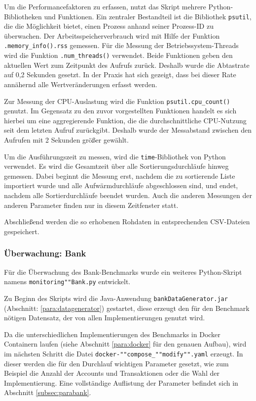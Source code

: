 \documentclass[fontsize=12pt,paper=a4,twoside=semi,parskip=half-,headsepline,headinclude]{scrreprt}
\begin{document}
Um die Performancefaktoren zu erfassen, nutzt das Skript mehrere Python-Bibliotheken und Funktionen. Ein zentraler Bestandteil ist die Bibliothek \texttt{psutil}, die die Möglichkeit bietet, einen Prozess anhand seiner Prozess-ID zu überwachen. Der Arbeitsspeicherverbrauch wird mit Hilfe der Funktion \texttt{.memory\_info().rss} gemessen. Für die Messung der Betriebssystem-Threads wird die Funktion \texttt{.num\_threads()} verwendet. Beide Funktionen geben den aktuellen Wert zum Zeitpunkt des Aufrufs zurück. Deshalb wurde die Abtastrate auf 0,2 Sekunden gesetzt. In der Praxis hat sich gezeigt, dass bei dieser Rate annähernd alle Wertveränderungen erfasst werden.

Zur Messung der CPU-Auslastung wird die Funktion \texttt{psutil.cpu\_count()} genutzt. Im Gegensatz zu den zuvor vorgestellten Funktionen handelt es sich hierbei um eine aggregierende Funktion, die die durchschnittliche CPU-Nutzung seit dem letzten Aufruf zurückgibt. Deshalb wurde der Messabstand zwischen den Aufrufen mit 2 Sekunden größer gewählt.

Um die Ausführungszeit zu messen, wird die \texttt{time}-Bibliothek von Python verwendet. Es wird die Gesamtzeit über alle Sortierungsdurchläufe hinweg gemessen. Dabei beginnt die Messung erst, nachdem die zu sortierende Liste importiert wurde und alle Aufwärmdurchläufe abgeschlossen sind, und endet, nachdem alle Sortierdurchläufe beendet wurden. Auch die anderen Messungen der anderen Parameter finden nur in diesem Zeitfenster statt. 

Abschließend werden die so erhobenen Rohdaten in entsprechenden CSV-Dateien gespeichert.

\subsubsection{Überwachung: Bank}
\label{subsubsec:monibank}

Für die Überwachung des Bank-Benchmarks wurde ein weiteres Python-Skript namens \texttt{monitoring""Bank.py} entwickelt.

Zu Beginn des Skripts wird die Java-Anwendung \texttt{bankDataGenerator.jar} (Abschnitt: \ref{para:datagenerator}) gestartet, diese erzeugt den für den Benchmark nötigen Datensatz, der von allen Implementierungen genutzt wird. 

Da die unterschiedlichen Implementierungen des Benchmarks in Docker Containern laufen (siehe Abschnitt \ref{para:docker} für den genauen Aufbau), wird im nächsten Schritt die Datei \texttt{docker-""compose\_""modify"".yaml} erzeugt. In dieser werden die für den Durchlauf wichtigen Parameter gesetzt, wie zum Beispiel die Anzahl der Accounts und Transaktionen oder die Wahl der Implementierung. Eine vollständige Auflistung der Parameter befindet sich in Abschnitt \ref{subsec:parabank}.
\end{document}
